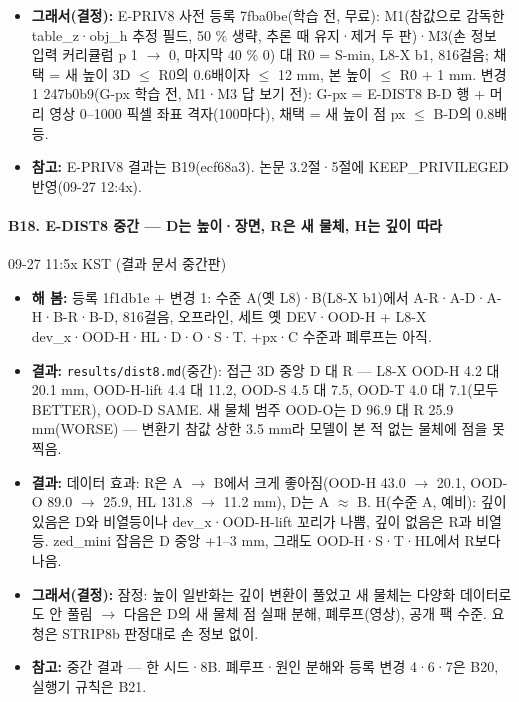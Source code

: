 \begin{itemize}
  \item \textbf{그래서(결정):} E-PRIV8 사전 등록 7fba0be(학습 전, 무료): M1(참값으로 감독한 table\_z·obj\_h 추정 필드, 50 \% 생략, 추론 때 유지·제거 두 판)·M3(손 정보 입력 커리큘럼 p 1 $\rightarrow$ 0, 마지막 40 \% 0) 대 R0 = S-min, L8-X b1, 816걸음; 채택 = 새 높이 3D $\leq$ R0의 0.6배이자 $\leq$ 12 mm, 본 높이 $\leq$ R0 + 1 mm. 변경 1 247b0b9(G-px 학습 전, M1·M3 답 보기 전): G-px = E-DIST8 B-D 행 + 머리 영상 0--1000 픽셀 좌표 격자(100마다), 채택 = 새 높이 점 px $\leq$ B-D의 0.8배 등.
  \item \textbf{참고:} E-PRIV8 결과는 B19(ecf68a3). 논문 3.2절·5절에 KEEP\_PRIVILEGED 반영(09-27 12:4x).
\end{itemize}

\paragraph{B18. E-DIST8 중간 --- D는 높이·장면, R은 새 물체, H는 깊이 따라}
{\small 09-27 11:5x KST (결과 문서 중간판)}
\begin{itemize}
  \item \textbf{해 봄:} 등록 1f1db1e + 변경 1: 수준 A(옛 L8)·B(L8-X b1)에서 A-R·A-D·A-H·B-R·B-D, 816걸음, 오프라인, 세트 옛 DEV·OOD-H + L8-X dev\_x·OOD-H·HL·D·O·S·T. +px·C 수준과 폐루프는 아직.
  \item \textbf{결과:} \texttt{results/\allowbreak{}dist8.\allowbreak{}md}(중간): 접근 3D 중앙 D 대 R --- L8-X OOD-H 4.2 대 20.1 mm, OOD-H-lift 4.4 대 11.2, OOD-S 4.5 대 7.5, OOD-T 4.0 대 7.1(모두 BETTER), OOD-D SAME. 새 물체 범주 OOD-O는 D 96.9 대 R 25.9 mm(WORSE) --- 변환기 참값 상한 3.5 mm라 모델이 본 적 없는 물체에 점을 못 찍음.
  \item \textbf{결과:} 데이터 효과: R은 A $\rightarrow$ B에서 크게 좋아짐(OOD-H 43.0 $\rightarrow$ 20.1, OOD-O 89.0 $\rightarrow$ 25.9, HL 131.8 $\rightarrow$ 11.2 mm), D는 A $\approx$ B. H(수준 A, 예비): 깊이 있음은 D와 비열등이나 dev\_x·OOD-H-lift 꼬리가 나쁨, 깊이 없음은 R과 비열등. zed\_mini 잡음은 D 중앙 +1--3 mm, 그래도 OOD-H·S·T·HL에서 R보다 나음.
  \item \textbf{그래서(결정):} 잠정: 높이 일반화는 깊이 변환이 풀었고 새 물체는 다양화 데이터로도 안 풀림 $\rightarrow$ 다음은 D의 새 물체 점 실패 분해, 폐루프(영상), 공개 팩 수준. 요청은 STRIP8b 판정대로 손 정보 없이.
  \item \textbf{참고:} 중간 결과 --- 한 시드·8B. 폐루프·원인 분해와 등록 변경 4·6·7은 B20, 실행기 규칙은 B21.
\end{itemize}

